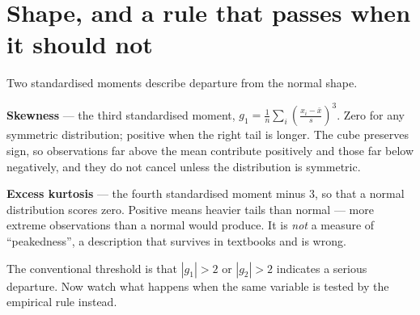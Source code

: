 \documentclass[
  letterpaper,
  10pt,
  twoside,
  openright,
  numbers=noenddot,
  chapterprefix=true]{scrbook}
\begin{document}
\section{Shape, and a rule that passes when it should
not}\label{shape-and-a-rule-that-passes-when-it-should-not}

Two standardised moments describe departure from the normal shape.

\begin{qmibdefinition}

{\textbf{Skewness}} --- the third standardised moment,
\(g_1 = \frac1n \sum_i \left(\frac{x_i - \bar x}{s}\right)^3\). Zero for
any symmetric distribution; positive when the right tail is longer. The
cube preserves sign, so observations far above the mean contribute
positively and those far below negatively, and they do not cancel unless
the distribution is symmetric.

\end{qmibdefinition}

\begin{qmibdefinition}

{\textbf{Excess kurtosis}} --- the fourth standardised moment minus 3,
so that a normal distribution scores zero. Positive means heavier tails
than normal --- more extreme observations than a normal would produce.
It is \emph{not} a measure of ``peakedness'', a description that
survives in textbooks and is wrong.

\end{qmibdefinition}

The conventional threshold is that \(|g_1| > 2\) or \(|g_2| > 2\)
indicates a serious departure. Now watch what happens when the same
variable is tested by the empirical rule instead.
\end{document}
